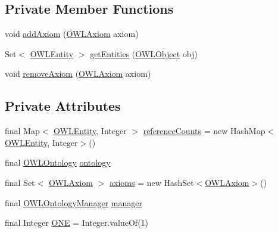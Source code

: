 \subsection*{Private Member Functions}
\begin{DoxyCompactItemize}
\item 
void \hyperlink{classcom_1_1clarkparsia_1_1owlapi_1_1explanation_1_1util_1_1_definition_tracker_aa28bbfc583ac0f3eaffe478386121600}{add\-Axiom} (\hyperlink{interfaceorg_1_1semanticweb_1_1owlapi_1_1model_1_1_o_w_l_axiom}{O\-W\-L\-Axiom} axiom)
\item 
Set$<$ \hyperlink{interfaceorg_1_1semanticweb_1_1owlapi_1_1model_1_1_o_w_l_entity}{O\-W\-L\-Entity} $>$ \hyperlink{classcom_1_1clarkparsia_1_1owlapi_1_1explanation_1_1util_1_1_definition_tracker_ab5a38e3bbf06b69aceb955b9ac62354e}{get\-Entities} (\hyperlink{interfaceorg_1_1semanticweb_1_1owlapi_1_1model_1_1_o_w_l_object}{O\-W\-L\-Object} obj)
\item 
void \hyperlink{classcom_1_1clarkparsia_1_1owlapi_1_1explanation_1_1util_1_1_definition_tracker_ac38a9da75445f8cca013ef95ba05db1f}{remove\-Axiom} (\hyperlink{interfaceorg_1_1semanticweb_1_1owlapi_1_1model_1_1_o_w_l_axiom}{O\-W\-L\-Axiom} axiom)
\end{DoxyCompactItemize}
\subsection*{Private Attributes}
\begin{DoxyCompactItemize}
\item 
final Map$<$ \hyperlink{interfaceorg_1_1semanticweb_1_1owlapi_1_1model_1_1_o_w_l_entity}{O\-W\-L\-Entity}, Integer $>$ \hyperlink{classcom_1_1clarkparsia_1_1owlapi_1_1explanation_1_1util_1_1_definition_tracker_a04d57edaa34e32325cab310bf6cf5190}{reference\-Counts} = new Hash\-Map$<$\hyperlink{interfaceorg_1_1semanticweb_1_1owlapi_1_1model_1_1_o_w_l_entity}{O\-W\-L\-Entity}, Integer$>$()
\item 
final \hyperlink{interfaceorg_1_1semanticweb_1_1owlapi_1_1model_1_1_o_w_l_ontology}{O\-W\-L\-Ontology} \hyperlink{classcom_1_1clarkparsia_1_1owlapi_1_1explanation_1_1util_1_1_definition_tracker_a8ef0afa6dbb2c5bdb3ed4dda7bda35e5}{ontology}
\item 
final Set$<$ \hyperlink{interfaceorg_1_1semanticweb_1_1owlapi_1_1model_1_1_o_w_l_axiom}{O\-W\-L\-Axiom} $>$ \hyperlink{classcom_1_1clarkparsia_1_1owlapi_1_1explanation_1_1util_1_1_definition_tracker_aa854695480c365ac4f83b48c76529850}{axioms} = new Hash\-Set$<$\hyperlink{interfaceorg_1_1semanticweb_1_1owlapi_1_1model_1_1_o_w_l_axiom}{O\-W\-L\-Axiom}$>$()
\item 
final \hyperlink{interfaceorg_1_1semanticweb_1_1owlapi_1_1model_1_1_o_w_l_ontology_manager}{O\-W\-L\-Ontology\-Manager} \hyperlink{classcom_1_1clarkparsia_1_1owlapi_1_1explanation_1_1util_1_1_definition_tracker_a54e58181c7848a820b194b4368f88848}{manager}
\item 
final Integer \hyperlink{classcom_1_1clarkparsia_1_1owlapi_1_1explanation_1_1util_1_1_definition_tracker_ab02b1a7411c12b247e2fd79d0bd832f6}{O\-N\-E} = Integer.\-value\-Of(1)
\end{DoxyCompactItemize}


